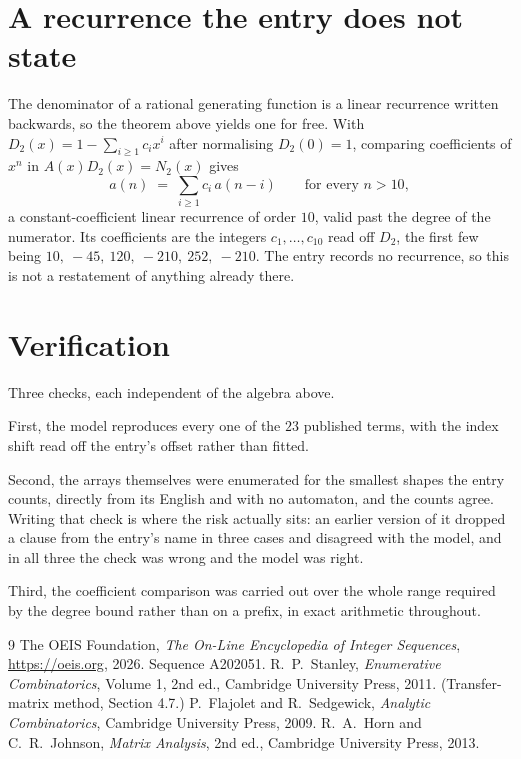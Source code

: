 \documentclass[11pt,a4paper]{article}
\theoremstyle{plain}
\theoremstyle{definition}
\begin{document}
\section{A recurrence the entry does not state}

The denominator of a rational generating function is a linear recurrence written backwards, so
the theorem above yields one for free. With $D_2(x)=1-\sum_{i\ge1}c_ix^i$ after normalising
$D_2(0)=1$, comparing coefficients of $x^n$ in $A(x)D_2(x)=N_2(x)$ gives
\[
a(n)\;=\;\sum_{i\ge1}c_i\,a(n-i)\qquad\text{for every }n>10,
\]
a constant-coefficient linear recurrence of order $10$, valid past the degree of the
numerator. Its coefficients are the integers $c_1,\dots,c_{10}$ read off $D_2$, the first few being $10,\ -45,\ 120,\ -210,\ 252,\ -210$. The entry records no recurrence, so this is not a restatement of anything
already there.

\section{Verification}

Three checks, each independent of the algebra above.

First, the model reproduces every one of the $23$ published terms, with the index shift
read off the entry's offset rather than fitted.

Second, the arrays themselves were enumerated for the smallest shapes the entry counts,
directly from its English and with no automaton, and the counts agree. Writing that check is
where the risk actually sits: an earlier version of it dropped a clause from the entry's name
in three cases and disagreed with the model, and in all three the check was wrong and the model
was right.

Third, the coefficient comparison was carried out over the whole range required by the degree
bound rather than on a prefix, in exact arithmetic throughout.

\begin{thebibliography}{9}
 The OEIS Foundation, \emph{The On-Line Encyclopedia of Integer
Sequences}, \url{https://oeis.org}, 2026. Sequence A202051.
 R.~P.~Stanley, \emph{Enumerative Combinatorics}, Volume 1, 2nd ed.,
Cambridge University Press, 2011. (Transfer-matrix method, Section 4.7.)
 P.~Flajolet and R.~Sedgewick, \emph{Analytic Combinatorics}, Cambridge
University Press, 2009.
 R.~A.~Horn and C.~R.~Johnson, \emph{Matrix Analysis}, 2nd ed., Cambridge
University Press, 2013.
\end{thebibliography}
\end{document}
